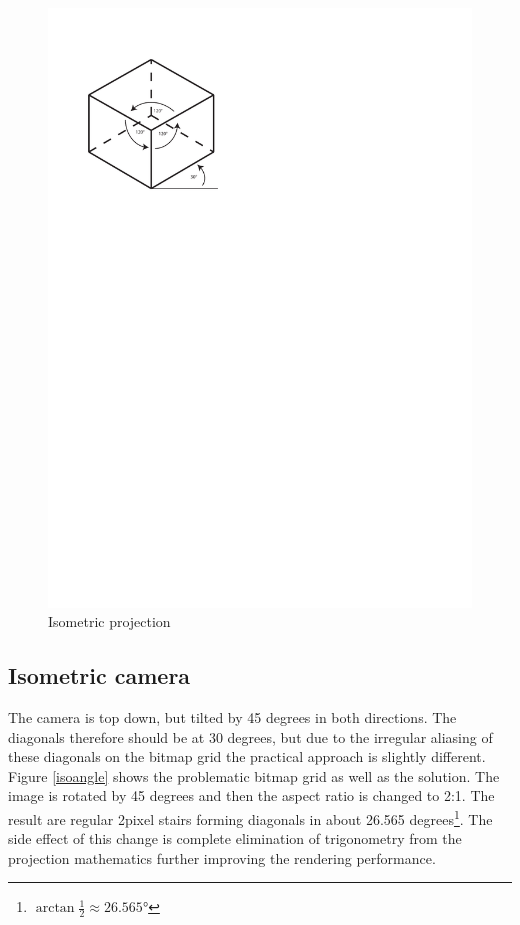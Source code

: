 \documentclass[11pt,oneside, final]{fithesis2}
\begin{document}
\begin{figure}[h]
	\centering
	\includegraphics[clip=true,trim=0 205mm 100mm 20mm]{thesis-isobox}
	\caption{Isometric projection}
	\label{isometric}
\end{figure}

\subsection{Isometric camera}
The camera is top down, but tilted by 45 degrees in both directions. The diagonals therefore should be at 30 degrees, but due to the irregular aliasing of these diagonals on the bitmap grid the practical approach is slightly different. Figure \ref{isoangle} shows the problematic bitmap grid as well as the solution. The image is rotated by 45 degrees and then the aspect ratio is changed to 2:1. The result are regular 2pixel stairs forming diagonals in about 26.565 degrees\footnote{\begin{math}\arctan \frac{1}{2} \approx 26.565\si{\degree}\end{math}}. The side effect of this change is complete elimination of trigonometry from the projection mathematics further improving the rendering performance.
\end{document}
